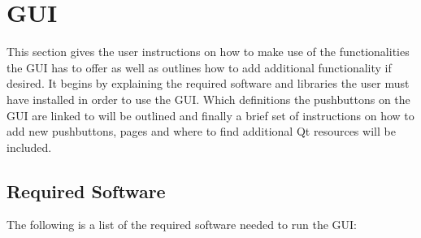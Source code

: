 \section{GUI}
This section gives the user instructions on how to make use of the functionalities the GUI has to offer as well as outlines how to add additional functionality if desired. It begins by explaining the required software and libraries the user must have installed in order to use the GUI. Which definitions the pushbuttons on the GUI are linked to will be outlined and finally a brief set of instructions on how to add new pushbuttons, pages and where to find additional Qt resources will be included. 

\subsection{Required Software}
The following is a list of the required software needed to run the GUI:


